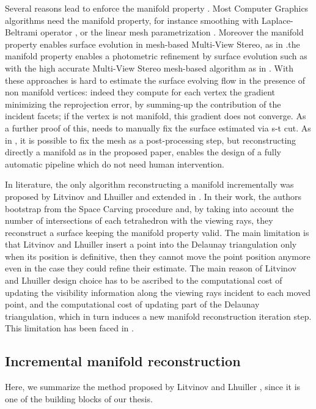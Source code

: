 Several reasons lead to enforce the manifold property \cite{lhuillier20152}. 
Most Computer Graphics algorithms need the manifold property, for instance smoothing with Laplace-Beltrami operator \cite{Meyer03}, or the linear mesh parametrization \cite{saboret00}.
Moreover the manifold property enables surface evolution in mesh-based Multi-View Stereo, as in \cite{vu_et_al_2012,delaunoy_et_al_08}.the manifold property enables a photometric refinement by surface evolution such as with the high accurate Multi-View Stereo mesh-based algorithm as in \cite{vu_et_al_2012,delaunoy_et_al_08}.
With these approaches is hard to estimate the surface evolving flow in the presence of non manifold vertices: indeed they compute for each vertex the gradient minimizing the reprojection error, by summing-up the contribution of the incident facets; if the vertex is not manifold, this gradient does not converge. As a further proof of this, \cite{vu_et_al_2012} needs to manually fix the surface estimated via s-t cut.
As in \cite{vu_et_al_2012}, it is possible to fix the mesh as a post-processing step, but reconstructing directly a manifold as in the proposed paper, enables the design of a fully automatic pipeline which do not need human intervention.

In literature, the only algorithm reconstructing a manifold incrementally was proposed by Litvinov and Lhuiller \cite{litvinov_lhuillier_13,litvinov_Lhiuller14} and extended in \cite{romanoni15a,romanoni15b}. 
In their work, the authors  bootstrap from the Space Carving procedure and, by taking into account the number of intersections of each tetrahedron with the viewing rays, they reconstruct a surface keeping the manifold property valid. 
The main limitation is that  Litvinov and Lhuiller insert a point into the Delaunay triangulation only when its position is definitive, then they cannot move the point position anymore even in the case they could refine their estimate. 
The main reason of Litvinov and Lhuiller design choice has to be ascribed to the computational cost of updating the visibility information along the viewing rays incident to each moved point, and the computational cost of updating part of the Delaunay triangulation, which in turn induces a new manifold reconstruction iteration step. This limitation has been faced in \cite{romanoni15a}.

\subsection{Incremental manifold reconstruction}
\label{subsec:incrementalManifold_2}
Here, we summarize the method proposed  by Litvinov and Lhuiller \cite{litvinov_lhuillier_13,litvinov_Lhiuller14}, since it is one of the building blocks of our thesis.

